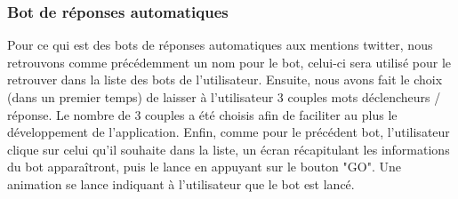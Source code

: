 \documentclass{article}
\begin{document}
\subsubsection{Bot de réponses automatiques}
Pour ce qui est des bots de réponses automatiques aux mentions twitter, nous retrouvons comme précédemment un nom pour le bot, celui-ci sera utilisé pour le retrouver dans la liste des bots de l'utilisateur. Ensuite, nous avons fait le choix (dans un premier temps) de laisser à l'utilisateur 3 couples mots déclencheurs / réponse. Le nombre de 3 couples a été choisis afin de faciliter au plus le développement de l'application.
\newline\newline
Enfin, comme pour le précédent bot, l'utilisateur clique sur celui qu'il souhaite dans la liste, un écran récapitulant les informations du bot apparaîtront, puis le lance en appuyant sur le bouton "GO". Une animation se lance indiquant à l'utilisateur que le bot est lancé.
\end{document}

